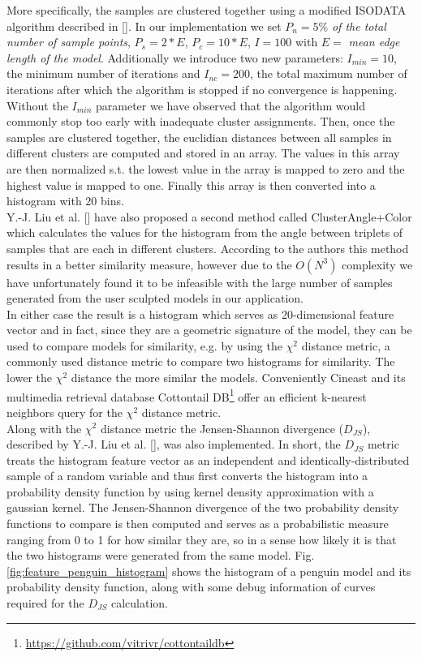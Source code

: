 More specifically, the samples are clustered together using a modified
ISODATA algorithm described in []. In our implementation we set $P_n = 5\%$ \textit{of the total number of sample points}, $P_s = 2 * E$, $P_c = 10 * E$, $I = 100$ with $E =$ \textit{mean edge length of the model}.
Additionally we introduce two new parameters: $I_{min} = 10$, the minimum number of iterations and $I_{nc} = 200$, the total maximum number of iterations after which the algorithm is stopped if no convergence is happening. Without
the $I_{min}$ parameter we have observed that the algorithm would commonly stop too early with inadequate cluster assignments. Then, once the samples are clustered together, the euclidian distances between all samples in different clusters
are computed and stored in an array. The values in this array are then normalized s.t. the lowest value in the array is mapped to zero and the highest value is mapped to one. Finally this array is then converted into a histogram with $20$
bins.\\
Y.-J. Liu et al. [] have also proposed a second method called ClusterAngle+Color which calculates the values for the histogram from the angle between triplets of samples that are each in different clusters. According
to the authors this method results in a better similarity measure, however due to the $O(N^3)$ complexity we have unfortunately found it to be infeasible with the large number of samples generated from the user sculpted models in our application.\\
In either case the result is a histogram which serves as 20-dimensional feature vector and in fact, since they are a geometric signature of the model, they can be used to compare models for similarity,
e.g. by using the $\chi^2$ distance metric, a commonly used distance metric to compare two histograms for similarity. The lower the $\chi^2$ distance the more similar the models. Conveniently Cineast and its multimedia retrieval
database Cottontail DB\footnote{\url{https://github.com/vitrivr/cottontaildb}} offer an efficient k-nearest neighbors query for the $\chi^2$ distance metric.\\
Along with the $\chi^2$ distance metric the Jensen-Shannon divergence ($D_{JS}$), described by Y.-J. Liu et al. [], was also implemented. In short, the $D_{JS}$ metric treats the histogram feature vector as an independent and identically-distributed sample of a random variable and thus first converts the histogram into a probability density function by using kernel density approximation with a gaussian kernel. The Jensen-Shannon divergence of the two probability density functions to compare is then computed and serves as a probabilistic measure ranging from 0 to 1 for how similar they are, so in a sense how likely it is that the two histograms were generated from the same model. Fig. \ref{fig:feature_penguin_histogram} shows the histogram of a penguin model and its probability density function, along with some debug information of curves required for the $D_{JS}$ calculation.




